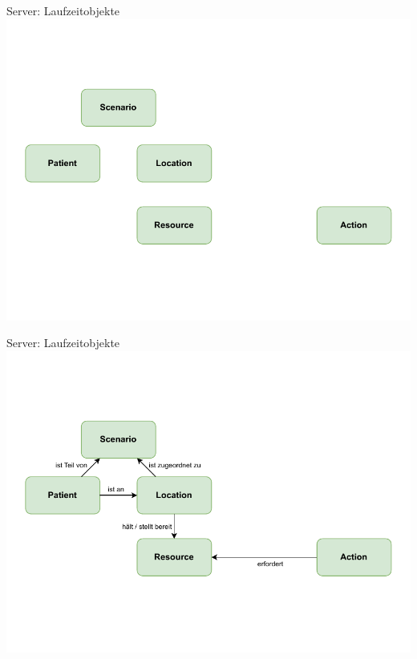 \begin{frame}{Server: Laufzeitobjekte}
	\centering
	\includegraphics[height=.9\textheight]{images/server/laufzeit_objekte_1.pdf}
\end{frame}

\begin{frame}{Server: Laufzeitobjekte}
	\centering
	\includegraphics[height=.9\textheight]{images/server/laufzeit_objekte_2.pdf}
\end{frame}

